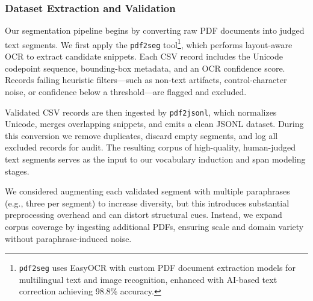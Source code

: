 \subsubsection{Dataset Extraction and Validation}
\label{sec:dataset-extraction}

Our segmentation pipeline begins by converting raw PDF documents into judged text segments.  We first apply the \texttt{pdf2seg} tool\footnote{\texttt{pdf2seg} uses EasyOCR with custom PDF document extraction models for multilingual text and image recognition, enhanced with AI-based text correction achieving 98.8\% accuracy.}, which performs layout-aware OCR to extract candidate snippets.  Each CSV record includes the Unicode codepoint sequence, bounding-box metadata, and an OCR confidence score.  Records failing heuristic filters—such as non-text artifacts, control-character noise, or confidence below a threshold—are flagged and excluded.

Validated CSV records are then ingested by \texttt{pdf2jsonl}, which normalizes Unicode, merges overlapping snippets, and emits a clean JSONL dataset.  During this conversion we remove duplicates, discard empty segments, and log all excluded records for audit.  The resulting corpus of high-quality, human-judged text segments serves as the input to our vocabulary induction and span modeling stages.

We considered augmenting each validated segment with multiple paraphrases (e.g., three per segment) to increase diversity, but this introduces substantial preprocessing overhead and can distort structural cues.  Instead, we expand corpus coverage by ingesting additional PDFs, ensuring scale and domain variety without paraphrase-induced noise.